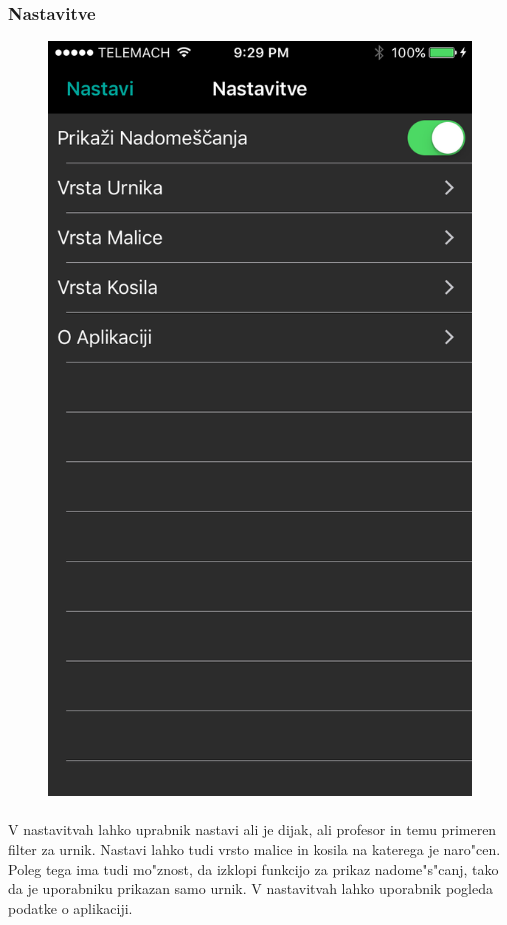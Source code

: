 \subsubsection{Nastavitve}
\begin{figure}
	\includegraphics[width=\linewidth]{images/nastavitve.png}
\end{figure}
\paragraph{}V nastavitvah lahko uprabnik nastavi ali je dijak, ali profesor in temu primeren filter za urnik. Nastavi lahko tudi vrsto malice in kosila na katerega je naro"cen. Poleg tega ima tudi mo"znost, da izklopi funkcijo za prikaz nadome"s"canj, tako da je uporabniku prikazan samo urnik. V nastavitvah lahko uporabnik pogleda podatke o aplikaciji.


